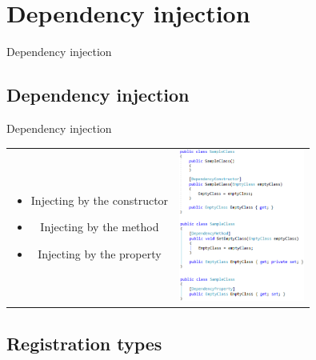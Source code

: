 \documentclass{beamer}
\begin{document}
\section{Dependency injection}

\begin{frame}{}
\begin{center}
\Huge{Dependency injection}
\end{center}
\end{frame}

\subsection*{Dependency injection}

\begin{frame}{Dependency injection}
\begin{table}
     \begin{small}
	\begin{tabular}{ c p{3cm} }
	
	\begin{minipage}{.6\textwidth}
	\large{\begin{itemize}
		\item Injecting by the constructor
		\item Injecting by the method
		\item Injecting by the property
	\end{itemize}}
   	 \end{minipage}
   	 &   	 
	\begin{minipage}{.4\textwidth}	
  		\includegraphics[height=5cm]{PresentationDependency.png}
   	 \end{minipage}

	\end{tabular}
     \end{small}
\end{table}
\end{frame}

\subsection*{Registration types}
\end{document}
